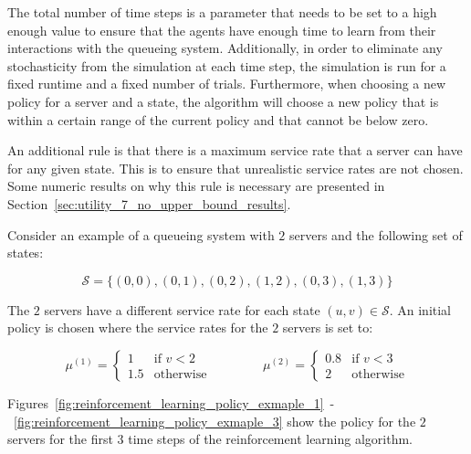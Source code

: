 The total number of time steps is a parameter that needs to be set to a high
enough value to ensure that the agents have enough time to learn from their
interactions with the queueing system.
Additionally, in order to eliminate any stochasticity from the simulation
at each time step, the simulation is run for a fixed runtime and a fixed number
of trials.
Furthermore, when choosing a new policy for a server and a state, the
algorithm will choose a new policy that is within a certain range of the
current policy and that cannot be below zero.

An additional rule is that there is a maximum service rate that a server can
have for any given state.
This is to ensure that unrealistic service rates are not chosen.
Some numeric results on why this rule is necessary are presented in
Section~\ref{sec:utility_7_no_upper_bound_results}.

Consider an example of a queueing system with \(2\) servers and the following
set of states:

\begin{equation}
    \mathcal{S} = \{(0, 0), (0, 1), (0, 2), (1, 2), (0, 3), (1, 3)\}
\end{equation}

The \(2\) servers have a different service rate for each state
\((u, v) \in \mathcal{S}\).
An initial policy is chosen where the service rates for the \(2\) servers is
set to:

\begin{equation*}
    \mu^{(1)} =
    \begin{cases}
        1 & \text{if } v < 2 \\
        1.5 & \text{otherwise}
    \end{cases}
    \qquad \qquad
    \mu^{(2)} =
    \begin{cases}
        0.8 & \text{if } v < 3 \\
        2 & \text{otherwise}
    \end{cases}
\end{equation*}

Figures~\ref{fig:reinforcement_learning_policy_exmaple_1}~-~\ref{fig:reinforcement_learning_policy_exmaple_3} show the
policy for the \(2\) servers for the first \(3\) time steps of the
reinforcement learning algorithm.

